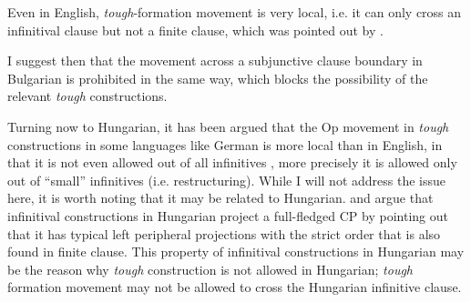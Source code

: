 \documentclass[output=paper]{langscibook}
\begin{document}
Even in English, \textit{tough}-formation movement is very local, i.e. it can only cross an infinitival clause but not a finite clause, which was pointed out by \citet{Stowell1986}. 

\begin{exe}
\ex \label{36ha}
\begin{xlist}
\end{xlist}
\end{exe}

I suggest then that the movement across a subjunctive clause boundary in Bulgarian is prohibited in the same way, which blocks the possibility of the relevant \textit{tough} constructions.

Turning now to Hungarian, it has been argued that the Op movement in \textit{tough} constructions in some languages like German is more local than in English, in that it is not even allowed out of all infinitives \citep{Wurmbrand2001,Kayne1989,Roberts1997}, more precisely it is allowed only out of “small” infinitives (i.e. restructuring). While I will not address the issue here, it is worth noting that it may be related to Hungarian. \citet{Kenesei2005} and \citet{Dalmi2004} argue that infinitival constructions in Hungarian project a full-fledged CP by pointing out that it has typical left peripheral projections with the strict order that is also found in finite clause. This property of infinitival constructions in Hungarian may be the reason why \textit{tough} construction is not allowed in Hungarian; \textit{tough} formation movement may not be allowed to cross the Hungarian infinitive clause.
\end{document}
